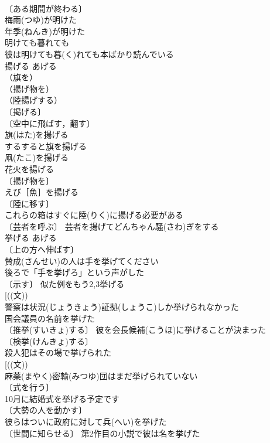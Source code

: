 \documentclass[8pt]{extreport}
\begin{document}
\begin{CJK}{UTF8}{min}
\\	〔ある期間が終わる〕
\\	梅雨(つゆ)が明けた 
\\	年季(ねんき)が明けた 
\\	明けても暮れても　
\\	彼は明けても暮(く)れても本ばかり読んでいる 
\\	揚げる	あげる	
\\	（旗を）
\\	（揚げ物を）
\\	（陸揚げする）
\\	〔掲げる〕
\\	〔空中に飛ばす，翻す〕
\\	旗(はた)を揚げる 
\\	するすると旗を揚げる 
\\	凧(たこ)を揚げる 
\\	花火を揚げる 
\\	〔揚げ物を〕
\\	えび［魚］を揚げる 
\\	〔陸に移す〕
\\	これらの箱はすぐに陸(りく)に揚げる必要がある 
\\	〔芸者を呼ぶ〕 芸者を揚げてどんちゃん騒(さわ)ぎをする 
\\	挙げる	あげる	
\\	〔上の方へ伸ばす〕
\\	賛成(さんせい)の人は手を挙げてください 
\\	後ろで「手を挙げろ」という声がした 
\\	〔示す〕 似た例をもう2,3挙げる 
\\	[((文))
\\	警察は状況(じょうきょう)証拠(しょうこ)しか挙げられなかった 
\\	国会議員の名前を挙げた 
\\	〔推挙(すいきょ)する〕 彼を会長候補(こうほ)に挙げることが決まった 
\\	〔検挙(けんきょ)する〕
\\	殺人犯はその場で挙げられた 
\\	[((文))
\\	麻薬(まやく)密輸(みつゆ)団はまだ挙げられていない 
\\	〔式を行う〕 
\\	10月に結婚式を挙げる予定です 
\\	〔大勢の人を動かす〕 
\\	彼らはついに政府に対して兵(へい)を挙げた 
\\	〔世間に知らせる〕 第2作目の小説で彼は名を挙げた 

\end{CJK}
\end{document}

